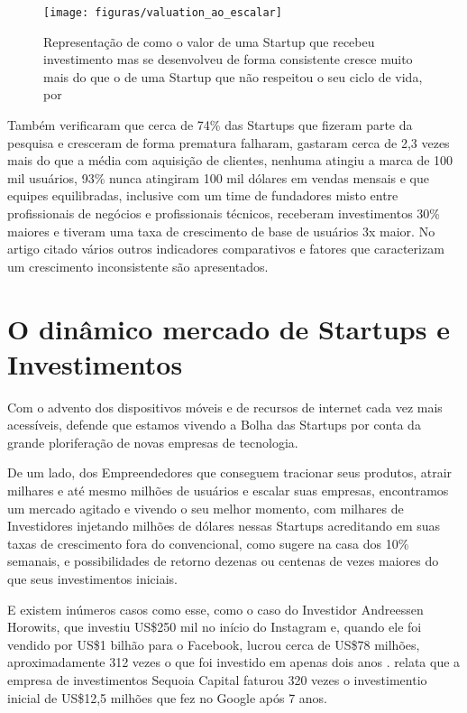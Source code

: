 \begin{figure}[!htb]
\centering
\texttt{[image: figuras/valuation\_ao\_escalar]}
\caption{Representação de como o valor de uma Startup que recebeu investimento mas se desenvolveu de forma consistente cresce muito mais do que o de uma Startup que não respeitou o seu ciclo de vida, por \cite{marmer2011startup}}
\label{Rotulo}
\end{figure}

Também verificaram que cerca de 74\% das Startups que fizeram parte da pesquisa e cresceram de forma prematura falharam, gastaram cerca de 2,3 vezes mais do que a média com aquisição de clientes, nenhuma atingiu a marca de 100 mil usuários, 93\% nunca atingiram 100 mil dólares em vendas mensais e que equipes equilibradas, inclusive com um time de fundadores misto entre profissionais de negócios e profissionais técnicos, receberam investimentos 30\% maiores e tiveram uma taxa de crescimento de base de usuários 3x maior. No artigo citado vários outros indicadores comparativos e fatores que caracterizam um crescimento inconsistente são apresentados. 

\section{O dinâmico mercado de Startups e Investimentos}
\label{section:o_dinamico_mercado_das_startups}

Com o advento dos dispositivos móveis e de recursos de internet cada vez mais acessíveis,  defende que estamos vivendo a Bolha das Startups por conta da grande ploriferação de novas empresas de tecnologia. 

De um lado, dos Empreendedores que conseguem tracionar seus produtos, atrair milhares e até mesmo milhões de usuários e escalar suas empresas, encontramos um mercado agitado e vivendo o seu melhor momento, com milhares de Investidores injetando milhões de dólares nessas Startups acreditando em suas taxas de crescimento fora do convencional, como  sugere na casa dos 10\% semanais, e possibilidades de retorno dezenas ou centenas de vezes maiores do que seus investimentos iniciais.

E existem inúmeros casos como esse, como o caso do Investidor Andreessen Horowits, que investiu US\$250 mil no início do Instagram e, quando ele foi vendido por US\$1 bilhão para o Facebook, lucrou cerca de US\$78 milhões, aproximadamente 312 vezes o que foi investido em apenas dois anos .  relata que a empresa de investimentos Sequoia Capital faturou 320 vezes o investimentio inicial de US\$12,5 milhões que fez no Google após 7 anos.

